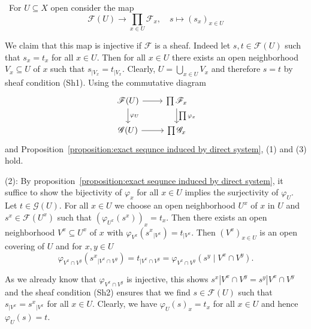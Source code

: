 \documentclass[12pt,a4paper]{book}
\newenvironment{prooff}{{\noindent\it\textcolor{cyan!40!black}{Proof}:}\,}{\par}
\theoremstyle{definition}
\begin{document}
\begin{prooff}
    For $U \subseteq X$ open consider the map
    $$
        \mathscr{F}(U) \rightarrow \prod_{x \in U} \mathscr{F}_x, \quad s \mapsto\left(s_x\right)_{x \in U}
    $$

    We claim that this map is injective if $\mathscr{F}$ is a sheaf. Indeed let $s, t \in \mathscr{F}(U)$ such that $s_x=t_x$ for all $x \in U$. Then for all $x \in U$ there exists an open neighborhood $V_x \subseteq U$ of $x$ such that $s_{\mid V_x}=t_{\mid V_x}$. Clearly, $U=\bigcup_{x \in U} V_x$ and therefore $s=t$ by sheaf condition (Sh1).
    Using the commutative diagram
    \[\begin{tikzcd}
            {\mathscr{F}(U)} & {\prod\mathscr{F}_x} \\
            {\mathscr{G}(U)} & {\prod\mathscr{G}_x}
            \arrow[from=1-1, to=1-2]
            \arrow["{\prod\varphi_x}", from=1-2, to=2-2]
            \arrow["{\varphi_U}", from=1-1, to=2-1]
            \arrow[from=2-1, to=2-2]
        \end{tikzcd}\]
    and Proposition~\ref{proposition:exact sequnce induced by direct system}, (1) and (3) hold.

    (2): By proposition~\ref{proposition:exact sequnce induced by direct system},  it suffice to show the bijectivity of $\varphi_x$ for all $x \in U$ implies the surjectivity of $\varphi_U$. Let $t \in \mathscr{G}(U)$. For all $x \in U$ we choose an open neighborhood $U^x$ of $x$ in $U$ and $s^x \in \mathscr{F}\left(U^x\right)$ such that $\left(\varphi_{U^x}\left(s^x\right)\right)_x=t_x$. Then there exists an open neighborhood $V^x \subseteq U^x$ of $x$ with $\varphi_{V^x}\left(s^x{ }_{\mid V^x}\right)=t_{\mid V^x}$. Then $\left(V^x\right)_{x \in U}$ is an open covering of $U$ and for $x, y \in U$
    $$
        \varphi_{V^x \cap V^y}\left(s^x{ }_{\mid V^x \cap V^y}\right)=t_{\mid V^x \cap V^y}=\varphi_{V^x \cap V^y}\left(s^y \mid V^x \cap V^y\right) .
    $$

    As we already know that $\varphi_{V^x \cap V^y}$ is injective, this shows $s^x\left|V^x \cap V^y=s^y\right| V^x \cap V^y$ and the sheaf condition (Sh2) ensures that we find $s \in \mathscr{F}(U)$ such that $s_{\mid V^x}=s^x{ }_{\mid V^x}$ for all $x \in U$. Clearly, we have $\varphi_U(s)_x=t_x$ for all $x \in U$ and hence $\varphi_U(s)=t$.
\end{prooff}
\end{document}
